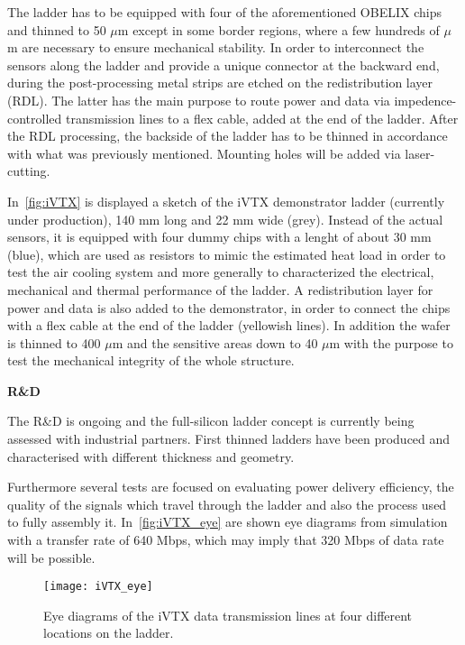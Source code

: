 The ladder has to be equipped with four of the aforementioned OBELIX chips and thinned to 50 $\mu$m except in some border regions, where a few hundreds of $\mu$m are necessary to ensure mechanical stability. 
In order to interconnect the sensors along the ladder and provide a unique connector at the backward end, during the post-processing metal strips are etched on the redistribution layer (RDL). The latter has the main purpose to route power and data via impedence-controlled transmission lines to a flex cable, added at the end of the ladder.
After the RDL processing, the backside of the ladder has to be thinned in accordance with what was previously mentioned. Mounting holes will be added via laser-cutting.


In~\autoref{fig:iVTX} is displayed a sketch of the iVTX demonstrator ladder (currently under production), 140 mm long and 22 mm wide (grey). Instead of the actual sensors, it is equipped with four dummy chips with a lenght of about 30 mm (blue), which are used as resistors to mimic the estimated heat load in order to test the air cooling system and more generally to characterized the electrical, mechanical and thermal performance of the ladder.
A redistribution layer for power and data is also added to the demonstrator, in order to connect the chips with a flex cable at the end of the ladder (yellowish lines). In addition the wafer is thinned to 400 $\mu$m and the sensitive areas down to 40 $\mu$m with the purpose to test the mechanical integrity of the whole structure.

\begin{description}
\item \textbf{R\&D}
\end{description}

The R\&D is ongoing and the full-silicon ladder concept is currently being assessed with industrial partners. First thinned ladders have been produced and characterised with different thickness and geometry.%

Furthermore several tests are focused on evaluating power delivery efficiency, the quality of the signals which travel through the ladder and also the process used to fully assembly it. 
In~\autoref{fig:iVTX_eye} are shown eye diagrams from simulation with a transfer rate of 640 Mbps, which may imply that 320 Mbps of data rate will be possible.

\begin{figure}[h!]
\centering
\texttt{[image: iVTX\_eye]}
\caption{Eye diagrams of the iVTX data transmission lines at four different locations on the ladder.}
\label{fig:iVTX_eye}
\end{figure}

